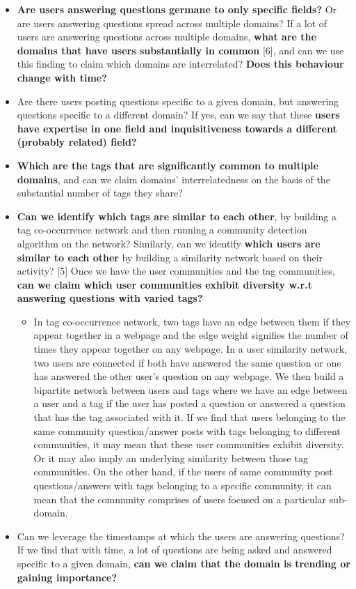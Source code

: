 \documentclass[11pt,a4paper,final]{article}
\begin{document}
\begin{itemize}
\item \textbf{Are users answering questions germane to only specific fields?} Or are users answering questions spread across multiple domains? If a lot of users are answering questions across multiple domains, \textbf{what are the domains that have users substantially in common} [6], and can we use this finding to claim which domains are interrelated? \textbf{Does this behaviour change with time?}

\item Are there users posting questions specific to a given domain, but answering questions specific to a different domain? If yes, can we say that these \textbf{users have expertise in one field and inquisitiveness towards a different (probably related) field?}

\item \textbf{Which are the tags that are significantly common to multiple domains}, and can we claim domains’ interrelatedness on the basis of the substantial number of tags they share? 

\item \textbf{Can we identify which tags are similar to each other}, by building a tag co-occurrence network and then running a community detection algorithm on the network? Similarly, can we identify \textbf{which users are similar to each other} by building a similarity network based on their activity? [5] Once we have the user communities and the tag communities, \textbf{can we claim which user communities exhibit diversity w.r.t answering questions with varied tags?}

\begin{itemize}
\item In tag co-occurrence network, two tags have an edge between them if they appear together in a webpage and the edge weight signifies the number of times they appear together on any webpage. In a user similarity network, two users are connected if both have answered the same question or one has answered the other user’s question on any webpage. We then build a bipartite network between users and tags where we have an edge between a user and a tag if the user has posted a question or answered a question that has the tag associated with it. If we find that users belonging to the same community question/answer posts with tags belonging to different communities, it may mean that these user communities exhibit diversity. Or it may also imply an underlying similarity between those tag communities. On the other hand, if the users of same community post questions/answers with tags belonging to a specific community, it can mean that the community comprises of users focused on a particular sub-domain.
\end{itemize}

\item Can we leverage the timestamps at which the users are answering questions? If we find that with time, a lot of questions are being asked and answered specific to a given domain, \textbf{can we claim that the domain is trending or gaining importance?}
\end{itemize}
\end{document}
